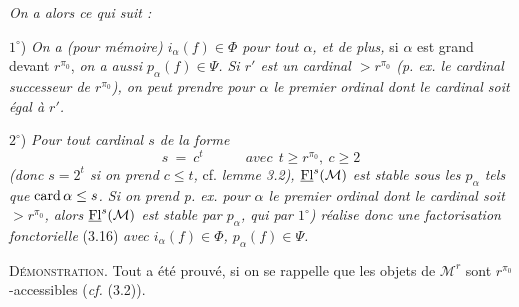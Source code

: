 \textit{On a alors ce qui suit :}

$1^\circ$) \textit{On a (pour mémoire) $i_\alpha(f)\in\Phi$ pour tout $\alpha$, et de plus,} si $\alpha$ est grand devant $r^{\pi_0}$, \textit{on a aussi $p_\alpha(f)\in\Psi$. Si $r'$ est un cardinal $>r^{\pi_0}$ (p. ex. le cardinal successeur de $r^{\pi_0}$), on peut prendre pour $\alpha$ le premier ordinal dont le cardinal soit égal à $r'$.}

$2^\circ$) \textit{Pour tout cardinal $s$ de la forme}
\[
s\ =\ c^t\qquad\quad\textit{avec}\ \ t\geq r^{\pi_0},\ c\geq 2
\]
\textit{(donc $s=2^t$ si on prend $c\leq t$,} cf. \textit{lemme 3.2), $\underline{\mathrm{Fl}}^s(\mathcal{M})$ est stable sous les $p_\alpha$ tels que} $\operatorname{card}\alpha\leq s$\textit{. Si on prend p. ex. pour $\alpha$ le premier ordinal dont le cardinal soit $>r^{\pi_0}$, alors $\underline{\mathrm{Fl}}^s(\mathcal{M})$ est stable par $p_\alpha$, qui par $1^\circ$) réalise donc une factorisation fonctorielle} \textup{(3.16)} \textit{avec $i_\alpha(f)\in\Phi$, $p_\alpha(f)\in\Psi$.}


\textsc{Démonstration}. Tout a été prouvé, si on se rappelle que les objets de $\mathcal{M}^r$ sont $r^{\pi_0}$-accessibles (\textit{cf.} (3.2)).

